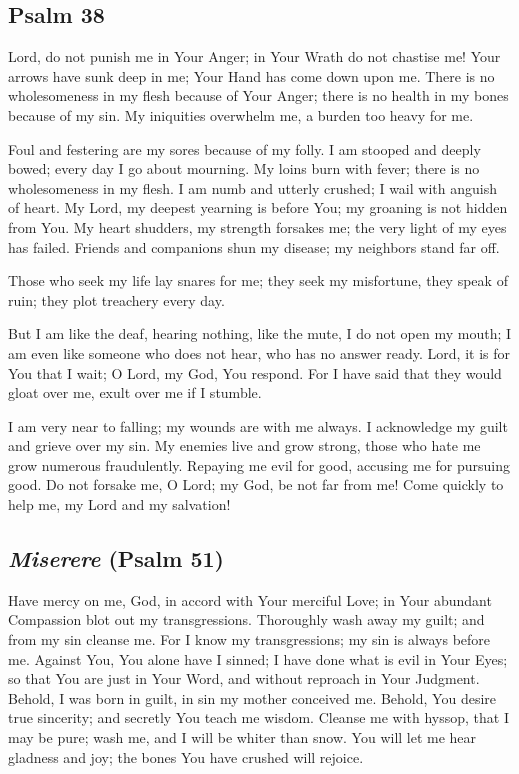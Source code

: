 \documentclass[12pt]{article}
\newcommand{\prayertitle}[1]{\subsection{#1}}
\newcommand{\indulgencedprayertitle}[1]{\prayertitle{#1 \protect\kreuz}}
\newcommand{\emphasis}[1]{\emph{#1}}
\newcommand{\emphasis}[1]{\textsl{#1}}
\newcommand{\foreign}[1]{\emphasis{#1}}
\begin{document}
\indulgencedprayertitle{Psalm 38}
Lord, do not punish me in Your Anger;
in Your Wrath do not chastise me!
Your arrows have sunk deep in me;
Your Hand has come down upon me.
There is no wholesomeness in my flesh because of Your Anger;
there is no health in my bones because of my sin.
My iniquities overwhelm me, a burden too heavy for me.

Foul and festering are my sores because of my folly.
I am stooped and deeply bowed;
every day I go about mourning.
My loins burn with fever;
there is no wholesomeness in my flesh.
I am numb and utterly crushed;
I wail with anguish of heart.
My Lord, my deepest yearning is before You;
my groaning is not hidden from You.
My heart shudders, my strength forsakes me;
the very light of my eyes has failed.
Friends and companions shun my disease;
my neighbors stand far off.

Those who seek my life lay snares for me;
they seek my misfortune, they speak of ruin;
they plot treachery every day.

But I am like the deaf, hearing nothing, like the mute, I do not open my mouth;
I am even like someone who does not hear, who has no answer ready.
Lord, it is for You that I wait;
O Lord, my God, You respond.
For I have said that they would gloat over me, exult over me if I stumble.

I am very near to falling;
my wounds are with me always.
I acknowledge my guilt
and grieve over my sin.
My enemies live and grow strong, those who hate me grow numerous fraudulently.
Repaying me evil for good,
accusing me for pursuing good.
Do not forsake me, O Lord;
my God, be not far from me!
Come quickly to help me, my Lord and my salvation!

\indulgencedprayertitle{\foreign{Miserere} (Psalm 51)}
Have mercy on me, God, in accord with Your merciful Love;
in Your abundant Compassion blot out my transgressions.
Thoroughly wash away my guilt;
and from my sin cleanse me.
For I know my transgressions;
my sin is always before me.
Against You, You alone have I sinned;
I have done what is evil in Your Eyes;
so that You are just in Your Word, and without reproach in Your Judgment.
Behold, I was born in guilt, in sin my mother conceived me.
Behold, You desire true sincerity;
and secretly You teach me wisdom.
Cleanse me with hyssop, that I may be pure;
wash me, and I will be whiter than snow.
You will let me hear gladness and joy;
the bones You have crushed will rejoice.
\end{document}
